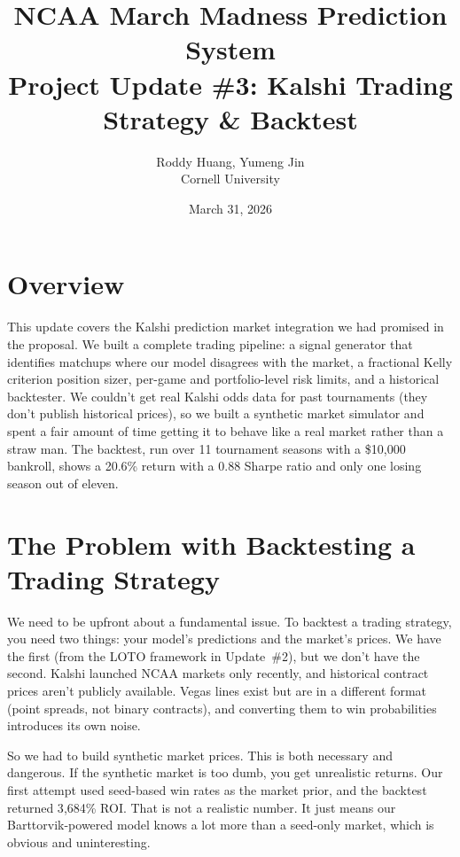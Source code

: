 \documentclass[11pt,a4paper]{article}
\title{%
    \vspace{-1cm}
    {\LARGE\bfseries NCAA March Madness Prediction System}\\[6pt]
    {\large Project Update \#3: Kalshi Trading Strategy \& Backtest}
}
\author{
    Roddy Huang, Yumeng Jin \\
    Cornell University
}
\date{March 31, 2026}
\begin{document}
\maketitle
\thispagestyle{fancy}


\section{Overview}

This update covers the Kalshi prediction market integration we had promised in the proposal. We built a complete trading pipeline: a signal generator that identifies matchups where our model disagrees with the market, a fractional Kelly criterion position sizer, per-game and portfolio-level risk limits, and a historical backtester. We couldn't get real Kalshi odds data for past tournaments (they don't publish historical prices), so we built a synthetic market simulator and spent a fair amount of time getting it to behave like a real market rather than a straw man. The backtest, run over 11 tournament seasons with a \$10{,}000 bankroll, shows a 20.6\% return with a 0.88 Sharpe ratio and only one losing season out of eleven.


\section{The Problem with Backtesting a Trading Strategy}

We need to be upfront about a fundamental issue. To backtest a trading strategy, you need two things: your model's predictions and the market's prices. We have the first (from the LOTO framework in Update~\#2), but we don't have the second. Kalshi launched NCAA markets only recently, and historical contract prices aren't publicly available. Vegas lines exist but are in a different format (point spreads, not binary contracts), and converting them to win probabilities introduces its own noise.

So we had to build synthetic market prices. This is both necessary and dangerous. If the synthetic market is too dumb, you get unrealistic returns. Our first attempt used seed-based win rates as the market prior, and the backtest returned 3{,}684\% ROI. That is not a realistic number. It just means our Barttorvik-powered model knows a lot more than a seed-only market, which is obvious and uninteresting.
\end{document}

